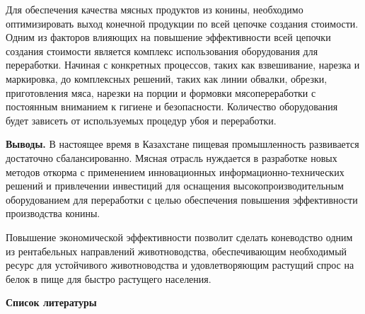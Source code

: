 Для обеспечения качества мясных продуктов из конины, необходимо
оптимизировать выход конечной продукции по всей цепочке создания
стоимости. Одним из факторов влияющих на повышение эффективности всей
цепочки создания стоимости является комплекс использования оборудования
для переработки. Начиная с конкретных процессов, таких как взвешивание,
нарезка и маркировка, до комплексных решений, таких как линии обвалки,
обрезки, приготовления мяса, нарезки на порции и формовки
мясопереработки с постоянным вниманием к гигиене и безопасности.
Количество оборудования будет зависеть от используемых процедур убоя и
переработки.

{\bfseries Выводы.} В настоящее время в Казахстане пищевая промышленность
развивается достаточно сбалансированно. Мясная отрасль нуждается в
разработке новых методов откорма с применением инновационных
информационно-технических решений и привлечении инвестиций для оснащения
высокопроизводительным оборудованием для переработки с целью обеспечения
повышения эффективности производства конины.

Повышение экономической эффективности позволит сделать коневодство одним
из рентабельных направлений животноводства, обеспечивающим необходимый
ресурс для устойчивого животноводства и удовлетворяющим растущий спрос
на белок в пище для быстро растущего населения.


\begin{center}
	{\bfseries Список литературы}
\end{center}

